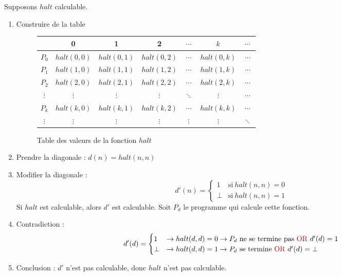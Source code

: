 Supposons $halt$ calculable.

\begin{enumerate}
\item Construire de la table
	\begin{figure}[H]
    		\centering
    		\begin{tabular}{c|cccccc}
		 & 0 & 1 & 2 & $\cdots$ & $k$ & $\cdots$ \\ 
		\hline 
		$P_0$ & $halt(0,0)$ & $halt(0,1)$ & $halt(0,2)$ & $\cdots$ & $halt(0,k)$ & $\cdots$ \\ 
		$P_1$ & $halt(1,0)$ & $halt(1,1)$ & $halt(1,2)$ & $\cdots$ & $halt(1,k)$ & $\cdots$ \\ 
		$P_2$ & $halt(2,0)$ & $halt(2,1)$ & $halt(2,2)$ & $\cdots$ & $halt(2,k)$ & $\cdots$ \\ 
		$\vdots$ & $\vdots$ & $\vdots$ & $\vdots$ & $\ddots$ & $\vdots$ & $\cdots$ \\ 
		$P_k$ & $halt(k,0)$ & $halt(k,1)$ & $halt(k,2)$ & $\cdots$ & $halt(k,k)$ & $\cdots$ \\ 
		$\vdots$ & $\vdots$ & $\vdots$ & $\vdots$ & $\vdots$ & $\vdots$ & $\ddots$ \\ 
		\end{tabular}
		\caption{Table des valeurs de la fonction $halt$}
	\end{figure}
\item Prendre la diagonale : $d(n) = halt(n,n)$
\item Modifier la diagonale :
	\begin{equation*}
		d'(n)=
		\begin{cases}
      		1 & \text{si}\ halt(n, n) = 0\\
      		\bot & \text{si}\ halt(n,n) = 1
      	\end{cases}
    \end{equation*}
    Si $halt$ est calculable, alors $d'$ est calculable. Soit $P_d$ le programme qui calcule cette fonction.
\item Contradiction :
	\begin{equation*}
		d'(d)=
		\begin{cases}
      		1 & \rightarrow halt(d,d) = 0 \rightarrow P_d \text{ ne se termine pas \textred{OR} }d'(d) = 1\\
      		\bot & \rightarrow halt(d,d) = 1 \rightarrow P_d \text{ se termine \textred{OR} }d'(d) = \bot
      	\end{cases}
    \end{equation*}
\item Conclusion : $d'$ n'est pas calculable, donc $halt$ n'est pas calculable.
\end{enumerate}

